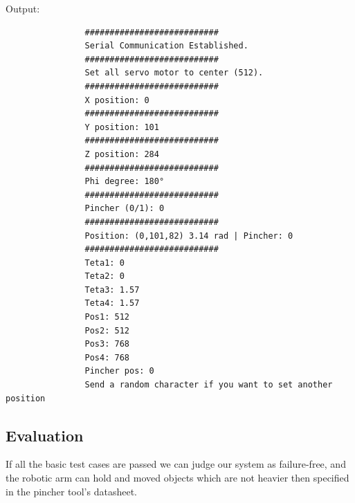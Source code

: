 			Output: 
			
			\begin{verbatim}
				###########################
				Serial Communication Established.
				###########################
				Set all servo motor to center (512).
				###########################
				X position: 0
				###########################
				Y position: 101
				###########################
				Z position: 284
				###########################
				Phi degree: 180°
				###########################
				Pincher (0/1): 0
				###########################
				Position: (0,101,82) 3.14 rad | Pincher: 0
				###########################
				Teta1: 0
				Teta2: 0
				Teta3: 1.57
				Teta4: 1.57
				Pos1: 512
				Pos2: 512
				Pos3: 768
				Pos4: 768
				Pincher pos: 0
				Send a random character if you want to set another position
			\end{verbatim}
			
		\subsection{Evaluation}
		
			\space{15pt}If all the basic test cases are passed we can judge our system as failure-free, and the robotic arm can hold and moved objects which are not heavier then specified in the pincher tool’s datasheet.